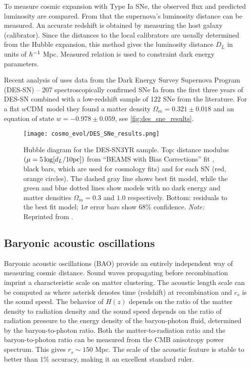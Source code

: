 To measure cosmic expansion with Type Ia SNe, the observed flux and predicted luminosity are compared. From that the supernova's luminosity distance can be measured. An accurate redshift is obtained by measuring the host galaxy (calibrator). Since the distances to the local calibrators are usually determined from the Hubble expansion, this method gives the luminosity distance $D_L$ in units of $h^{-1}$ Mpc. Measured relation is used to constraint dark energy parameters.

Recent analysis of \textcite{Abbott_2019} uses data from the Dark Energy Survey Supernova Program (DES-SN) -- 207 spectroscopically confirmed SNe Ia from the first three years of DES-SN combined with a low-redshift sample of 122 SNe from the literature. For a flat $w$CDM\ model they found a matter density $\Omega_m=0.321\pm0.018$ and an equation of state $w=-0.978\pm0.059$, see \autoref{fig:des_sne_results}.

\begin{figure}[hbt]
    \centering
    \texttt{[image: cosmo\_evol/DES\_SNe\_results.png]}
    \caption{Hubble diagram for the DES-SN3YR sample. Top: distance modulus $(\mu =5\log [d_L/10\rm{pc}])$ from ``BEAMS with Bias Corrections'' fit \parencite{Kessler_2017}, black bars, which are used for cosmology fits) and for each SN (red, orange circles). The dashed gray line shows best fit model, while the green and blue dotted lines show models with no dark energy and matter densities $\Omega_m = 0.3$ and $1.0$ respectively. Bottom: residuals to the best fit model; $1\sigma$ error bars show 68\% confidence. \textit{Note:} Reprinted from \textcite{Abbott_2019}.}
    \label{fig:des_sne_results}
\end{figure}
\subsection{Baryonic acoustic oscillations}
\label{sec:bao}
Baryonic acoustic oscillations (BAO) provide an entirely independent way of measuring cosmic distance. Sound waves propagating before recombination imprint a characteristic scale on matter clustering. The acoustic length scale can be computed as
where asterisk denotes time (redshift) at recombination and $c_s$ is the sound speed. The behavior of $H(z)$ depends on the ratio of the matter density to radiation density and the sound speed depends on the ratio of radiation pressure to the energy density of the baryon-photon fluid, determined by the baryon-to-photon ratio. Both the matter-to-radiation ratio and the baryon-to-photon ratio can be measured from the CMB anisotropy power spectrum. This gives $r_s\sim150$ Mpc. The scale of the acoustic feature is stable to better than 1\% accuracy, making it an excellent standard ruler.

